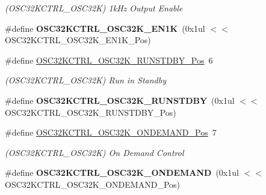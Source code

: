 \begin{DoxyCompactItemize}
\begin{DoxyCompactList}\small\item\em (O\+S\+C32\+K\+C\+T\+R\+L\+\_\+\+O\+S\+C32\+K) 1k\+Hz Output Enable \end{DoxyCompactList}\item 
\hypertarget{group___s_a_m_l21___o_s_c32_k_c_t_r_l_ga41a467956481bcce6414370dad88aa8a}{}\#define {\bfseries O\+S\+C32\+K\+C\+T\+R\+L\+\_\+\+O\+S\+C32\+K\+\_\+\+E\+N1\+K}~(0x1ul $<$$<$ O\+S\+C32\+K\+C\+T\+R\+L\+\_\+\+O\+S\+C32\+K\+\_\+\+E\+N1\+K\+\_\+\+Pos)\label{group___s_a_m_l21___o_s_c32_k_c_t_r_l_ga41a467956481bcce6414370dad88aa8a}

\item 
\hypertarget{group___s_a_m_l21___o_s_c32_k_c_t_r_l_ga79e315ae3cc19e6e3c5c91fa8b91b871}{}\#define \hyperlink{group___s_a_m_l21___o_s_c32_k_c_t_r_l_ga79e315ae3cc19e6e3c5c91fa8b91b871}{O\+S\+C32\+K\+C\+T\+R\+L\+\_\+\+O\+S\+C32\+K\+\_\+\+R\+U\+N\+S\+T\+D\+B\+Y\+\_\+\+Pos}~6\label{group___s_a_m_l21___o_s_c32_k_c_t_r_l_ga79e315ae3cc19e6e3c5c91fa8b91b871}

\begin{DoxyCompactList}\small\item\em (O\+S\+C32\+K\+C\+T\+R\+L\+\_\+\+O\+S\+C32\+K) Run in Standby \end{DoxyCompactList}\item 
\hypertarget{group___s_a_m_l21___o_s_c32_k_c_t_r_l_ga8aec768189ef532beb6ea41b78925bb9}{}\#define {\bfseries O\+S\+C32\+K\+C\+T\+R\+L\+\_\+\+O\+S\+C32\+K\+\_\+\+R\+U\+N\+S\+T\+D\+B\+Y}~(0x1ul $<$$<$ O\+S\+C32\+K\+C\+T\+R\+L\+\_\+\+O\+S\+C32\+K\+\_\+\+R\+U\+N\+S\+T\+D\+B\+Y\+\_\+\+Pos)\label{group___s_a_m_l21___o_s_c32_k_c_t_r_l_ga8aec768189ef532beb6ea41b78925bb9}

\item 
\hypertarget{group___s_a_m_l21___o_s_c32_k_c_t_r_l_ga4843fe7b01910e039aa166349b07e00d}{}\#define \hyperlink{group___s_a_m_l21___o_s_c32_k_c_t_r_l_ga4843fe7b01910e039aa166349b07e00d}{O\+S\+C32\+K\+C\+T\+R\+L\+\_\+\+O\+S\+C32\+K\+\_\+\+O\+N\+D\+E\+M\+A\+N\+D\+\_\+\+Pos}~7\label{group___s_a_m_l21___o_s_c32_k_c_t_r_l_ga4843fe7b01910e039aa166349b07e00d}

\begin{DoxyCompactList}\small\item\em (O\+S\+C32\+K\+C\+T\+R\+L\+\_\+\+O\+S\+C32\+K) On Demand Control \end{DoxyCompactList}\item 
\hypertarget{group___s_a_m_l21___o_s_c32_k_c_t_r_l_gabd1a7d12ca291f8c383bf58d4fd65d06}{}\#define {\bfseries O\+S\+C32\+K\+C\+T\+R\+L\+\_\+\+O\+S\+C32\+K\+\_\+\+O\+N\+D\+E\+M\+A\+N\+D}~(0x1ul $<$$<$ O\+S\+C32\+K\+C\+T\+R\+L\+\_\+\+O\+S\+C32\+K\+\_\+\+O\+N\+D\+E\+M\+A\+N\+D\+\_\+\+Pos)\label{group___s_a_m_l21___o_s_c32_k_c_t_r_l_gabd1a7d12ca291f8c383bf58d4fd65d06}


\end{DoxyCompactItemize}
